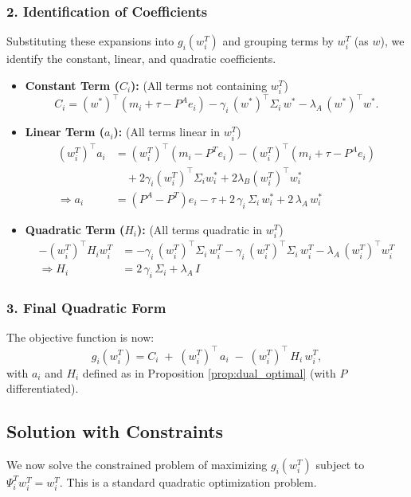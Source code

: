 \documentclass[12pt]{article}
\begin{document}
\subsubsection{2. Identification of Coefficients}
Substituting these expansions into $g_i(w_i^T)$ and grouping terms by $w_i^T$ (as $w$), we identify the constant, linear, and quadratic coefficients.

\begin{itemize}
  \item \textbf{Constant Term ($C_i$):} (All terms not containing $w_i^T$)
    \[
      C_i = (w^*)^\top (m_i + \tau - P^A e_i) 
            - \gamma_i\,(w^*)^\top \Sigma_i\,w^*
            - \lambda_A\,(w^*)^\top w^*.
    \]
  
  \item \textbf{Linear Term ($a_i$):} (All terms linear in $w_i^T$)
    \begin{align*}
      (w_i^T)^\top a_i &= (w_i^T)^\top (m_i - P^T e_i) - (w_i^T)^\top (m_i + \tau - P^A e_i) \\
                      &\quad + 2\gamma_i (w_i^T)^\top \Sigma_i w_i^* + 2\lambda_B (w_i^T)^\top w_i^* \\
      \Rightarrow a_i &= (P^A - P^T)e_i - \tau
                      + 2\,\gamma_i\,\Sigma_i\,w_i^*
                      + 2\,\lambda_A\,w_i^*
    \end{align*}
    
  \item \textbf{Quadratic Term ($H_i$):} (All terms quadratic in $w_i^T$)
    \begin{align*}
      -(w_i^T)^\top H_i w_i^T &= - \gamma_i\,(w_i^T)^\top \Sigma_i\,w_i^T - \gamma_i\,(w_i^T)^\top \Sigma_i\,w_i^T - \lambda_A\,(w_i^T)^\top w_i^T \\
      \Rightarrow H_i &= 2\,\gamma_i\,\Sigma_i + \lambda_A\,I
    \end{align*}
\end{itemize}

\subsubsection{3. Final Quadratic Form}
The objective function is now:
\[
g_i(w_i^T)
= C_i
\;+\;(w_i^T)^\top\,a_i
\;-\;(w_i^T)^\top\,H_i\,w_i^T,
\]
with $a_i$ and $H_i$ defined as in Proposition \ref{prop:dual_optimal} (with $P$ differentiated).

\subsection{Solution with Constraints}
We now solve the constrained problem of maximizing $g_i(w_i^T)$ subject to $\Psi_i^T w_i^T = w_i^T$. This is a standard quadratic optimization problem.
\end{document}
